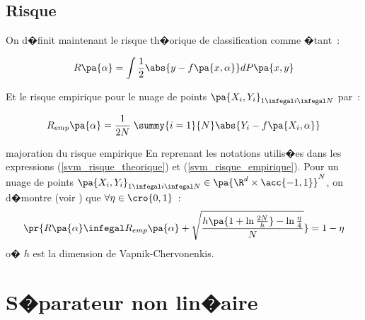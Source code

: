 \subsection{Risque}

On d�finit maintenant le risque th�orique de classification comme �tant~:

            \begin{eqnarray}
            R\pa{\alpha} = \int \frac{1}{2} \abs{y - f\pa{x,\alpha}} dP\pa{x,y}
            \label{svm_risque_theorique}
            \end{eqnarray}

Et le risque empirique pour le nuage de points $\pa{X_i,Y_i}_{1 \infegal i \infegal N}$ par~:

            \begin{eqnarray}
            R_{emp}\pa{\alpha} = \frac{1}{2N} \; \summy{i=1}{N} \abs{ Y_i - f\pa{X_i,\alpha}}
            \label{svm_risque_empirique}
            \end{eqnarray}

        \begin{xtheorem}{majoration du risque empirique}
        En reprenant les notations utilis�es dans les expressions 
        (\ref{svm_risque_theorique}) et (\ref{svm_risque_empirique}). Pour 
        un nuage de points  $\pa{X_i,Y_i}_{1 \infegal i \infegal N} \in \pa{\R^d \times \acc{-1,1} }^N$, 
        on d�montre (voir ) que $\forall \eta \in \cro{0,1}$~:
                    $$
                    \pr{ 
                    R\pa{\alpha} \infegal R_{emp}\pa{\alpha} +
                            \sqrt{\frac    {h \pa{ 1+ \ln \frac{2N}{h} } - \ln \frac{\eta}{4} }
                                                    {N}
                            }
                    } = 1 - \eta
                    $$
        o� $h$ est la dimension de Vapnik-Chervonenkis.
        \end{xtheorem}
        





\section{S�parateur non lin�aire}



